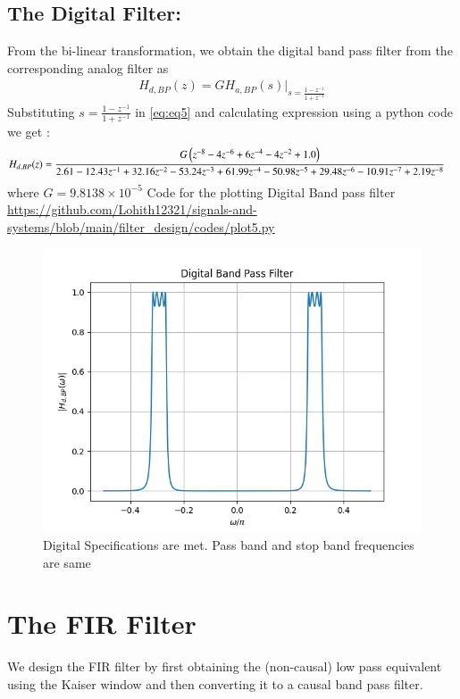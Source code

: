 \documentclass{article}
\begin{document}
\subsection{\textbf{The Digital Filter:}}
From the bi-linear transformation, we obtain the digital band pass filter from the corresponding analog filter as
\begin{align}
    H_{d,BP}(z) = GH_{a,BP}(s)\vert_{s = \frac{1-z^{-1}}{1 + z^{-1}}}
\end{align}
Substituting $s=\frac{1-z^{-1}}{1+z^{-1}}$ in \eqref{eq:eq5} and calculating expression using a python code we get :
\begin{align}
    H_{d,BP}(z) &= \frac{G\left(z^{-8} - 4z^{-6} + 6z^{-4} - 4z^{-2} + 1.0\right)}{2.61 - 12.43z^{-1} + 32.16z^{-2} - 53.24z^{-3} + 61.99z^{-4} - 50.98z^{-5} + 29.48z^{-6} - 10.91z^{-7} + 2.19z^{-8}}
\end{align}
where $G=9.8138\times 10^{-5}$   
Code for the plotting Digital Band pass filter\\
\href{https://github.com/Lohith12321/signals-and-systems/blob/main/filter_design/codes/plot5.py}{https://github.com/Lohith12321/signals-and-systems/blob/main/filter_design/codes/plot5.py}
\begin{figure}[H]
\centering
\includegraphics[width=1\columnwidth]{figs/plot5.png}
\caption{Digital Specifications are met. Pass band and stop band frequencies are same}
\label{fig:Digital_BPF}
\end{figure}
\section{The FIR Filter}
We design the FIR filter by first obtaining the (non-causal) low pass equivalent using the Kaiser window and then converting it to a causal band pass filter.
\end{document}
